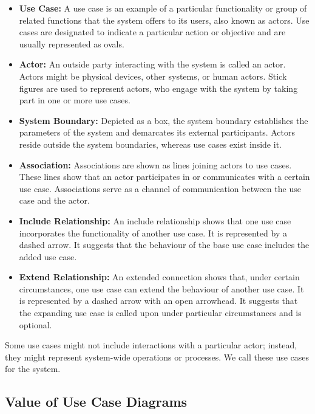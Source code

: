 \begin{itemize}
    \item \textbf{Use Case:} A use case is an example of a particular functionality or group of related functions that the system offers to its users, also known as actors. Use cases are designated to indicate a particular action or objective and are usually represented as ovals.

    \item \textbf{Actor:} An outside party interacting with the system is called an actor. Actors might be physical devices, other systems, or human actors. Stick figures are used to represent actors, who engage with the system by taking part in one or more use cases.

    \item \textbf{System Boundary:} Depicted as a box, the system boundary establishes the parameters of the system and demarcates its external participants. Actors reside outside the system boundaries, whereas use cases exist inside it.

    \item \textbf{Association:} Associations are shown as lines joining actors to use cases. These lines show that an actor participates in or communicates with a certain use case. Associations serve as a channel of communication between the use case and the actor.

    \item \textbf{Include Relationship:} An include relationship shows that one use case incorporates the functionality of another use case. It is represented by a dashed arrow. It suggests that the behaviour of the base use case includes the added use case.

    \item \textbf{Extend Relationship:} An extended connection shows that, under certain circumstances, one use case can extend the behaviour of another use case. It is represented by a dashed arrow with an open arrowhead. It suggests that the expanding use case is called upon under particular circumstances and is optional.

\end{itemize}
Some use cases might not include interactions with a particular actor; instead, they might represent system-wide operations or processes. We call these use cases for the system.

\subsection{Value of Use Case Diagrams}

